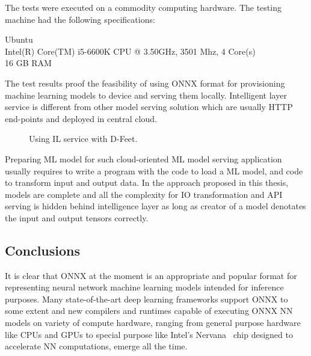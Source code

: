 \documentclass[english, 12pt, a4paper, elec, utf8, online]{aaltothesis}
\begin{document}
The tests were executed on a commodity computing hardware. The testing machine had the following specifications:

\begin{center}
Ubuntu \\
Intel(R) Core(TM) i5-6600K CPU @ 3.50GHz, 3501 Mhz, 4 Core(s) \\ 
16 GB RAM
\end{center}
 
The test results proof the feasibility of using ONNX format for provisioning machine learning models to device and serving them locally. Intelligent layer service is different from other model serving solution which are usually HTTP end-points and deployed in central cloud. 

\begin{figure}[h!]
\centering
{}
\caption{Using IL service with D-Feet.}\label{fig:dfeet}
\end{figure}


Preparing ML model for such cloud-oriented ML model serving application usually requires to write a program with the code to load a ML model, and code to transform input and output data. In the approach proposed in this thesis, models are complete and all the complexity for IO transformation and API serving is hidden behind intelligence layer as long as creator of a model denotates the input and output tensors correctly.

\subsection{Conclusions}
It is clear that ONNX at the moment is an appropriate and popular format for representing neural network machine learning models intended for inference purposes. Many state-of-the-art deep learning frameworks support ONNX to some extent and new compilers and runtimes capable of executing ONNX NN models on variety of compute hardware, ranging from general purpose hardware like CPUs and GPUs to special purpose like Intel's Nervana~\cite{cyphers2018intel} chip designed to accelerate NN computations, emerge all the time.
\end{document}
